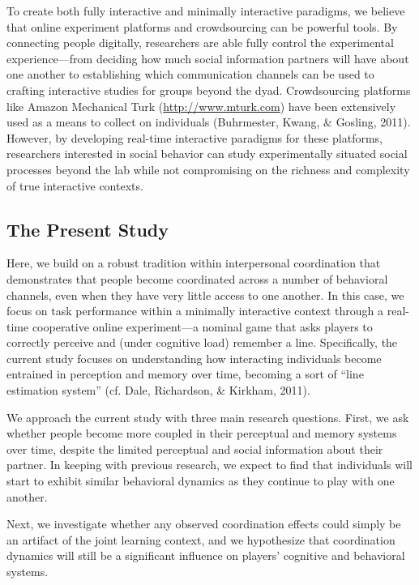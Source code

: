 \documentclass[10pt, letterpaper]{article}
\begin{document}
To create both fully interactive and minimally interactive paradigms, we
believe that online experiment platforms and crowdsourcing can be
powerful tools. By connecting people digitally, researchers are able
fully control the experimental experience---from deciding how much
social information partners will have about one another to establishing
which communication channels can be used to crafting interactive studies
for groups beyond the dyad. Crowdsourcing platforms like Amazon
Mechanical Turk (\url{http://www.mturk.com}) have been extensively used
as a means to collect on individuals (Buhrmester, Kwang, \& Gosling,
2011). However, by developing real-time interactive paradigms for these
platforms, researchers interested in social behavior can study
experimentally situated social processes beyond the lab while not
compromising on the richness and complexity of true interactive
contexts.

\subsection{The Present Study}\label{the-present-study}

Here, we build on a robust tradition within interpersonal coordination
that demonstrates that people become coordinated across a number of
behavioral channels, even when they have very little access to one
another. In this case, we focus on task performance within a minimally
interactive context through a real-time cooperative online
experiment---a nominal game that asks players to correctly perceive and
(under cognitive load) remember a line. Specifically, the current study
focuses on understanding how interacting individuals become entrained in
perception and memory over time, becoming a sort of ``line estimation
system'' (cf. Dale, Richardson, \& Kirkham, 2011).

We approach the current study with three main research questions. First,
we ask whether people become more coupled in their perceptual and memory
systems over time, despite the limited perceptual and social information
about their partner. In keeping with previous research, we expect to
find that individuals will start to exhibit similar behavioral dynamics
as they continue to play with one another.

Next, we investigate whether any observed coordination effects could
simply be an artifact of the joint learning context, and we hypothesize
that coordination dynamics will still be a significant influence on
players' cognitive and behavioral systems.
\end{document}
